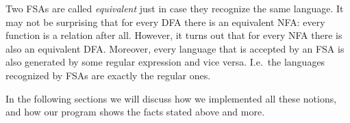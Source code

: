 Two FSAs are called \emph{equivalent} just in case they recognize the same language. It may not be surprising that for every DFA there is an equivalent NFA: every function is a relation after all. However, it turns out that for every NFA there is also an equivalent DFA. Moreover, every language that is accepted by an FSA is also generated by some regular expression and vice versa. I.e.\ the languages recognized by FSAs are exactly the regular ones. 

In the following sections we will discuss how we implemented all these notions, and how our program shows the facts stated above and more.
